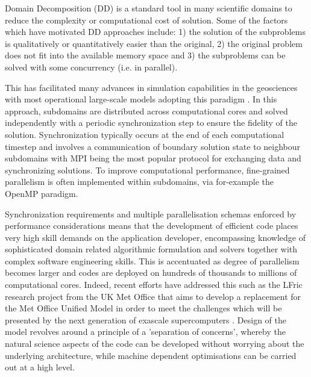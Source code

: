 \documentclass[acmsmall,review,anonymous]{acmart}\settopmatter{printfolios=true,printccs=false,printacmref=false}
\begin{document}
Domain Decomposition (DD) is a standard tool in many scientific domains to reduce the complexity or computational cost of solution. Some of the factors which have motivated DD approaches include: 1) the solution of the subproblems is qualitatively or quantitatively easier than the original, 2) the original problem does not fit into the available memory space and 3) the subproblems can be solved with some concurrency (i.e. in parallel).

This has facilitated many advances in simulation capabilities in the geosciences with most operational large-scale models adopting this paradigm \citep{michalakes2001development, hu2013scalable, hammond2014evaluating}. In this approach, subdomains are distributed across computational cores and solved independently with a periodic synchronization step to ensure the fidelity of the solution. Synchronization typically occurs at the end of each computational timestep and involves a communication of boundary solution state to neighbour subdomains with MPI being the most popular protocol for exchanging data and synchronizing solutions. To improve computational performance, fine-grained parallelism is often implemented within subdomains, via for-example the OpenMP paradigm.

Synchronization requirements and multiple parallelisation schemas enforced by performance considerations means that the development of efficient code places very high skill demands on the application developer, encompassing knowledge of sophisticated domain related algorithmic formulation and solvers together with complex software engineering skills. This is accentuated as degree of parallelism becomes larger and codes are deployed on hundreds of thousands to millions of computational cores. Indeed, recent efforts have addressed this such as the LFric research project from the UK Met Office that aims to develop a replacement for the Met Office Unified Model in order to meet the challenges which will be presented by the next generation of exascale supercomputers \citep{melvin2017lfric}. Design of the model revolves around a principle of a 'separation of concerns', whereby the natural science aspects of the code can be developed without worrying about the underlying architecture, while machine dependent optimisations can be carried out at a high level.
\end{document}
